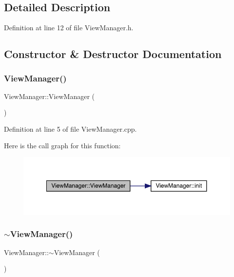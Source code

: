 \subsection{Detailed Description}


Definition at line 12 of file View\+Manager.\+h.



\subsection{Constructor \& Destructor Documentation}
\mbox{\label{class_view_manager_a0f78a0547f1946a9e19aa28d926ba152}} 
\subsubsection{\texorpdfstring{View\+Manager()}{ViewManager()}}
{\footnotesize\ttfamily View\+Manager\+::\+View\+Manager (\begin{DoxyParamCaption}{ }\end{DoxyParamCaption})}



Definition at line 5 of file View\+Manager.\+cpp.

Here is the call graph for this function\+:
\nopagebreak
\begin{figure}[H]
\begin{center}
\leavevmode
\includegraphics[width=350pt]{class_view_manager_a0f78a0547f1946a9e19aa28d926ba152_cgraph}
\end{center}
\end{figure}
\mbox{\label{class_view_manager_ad80032be506a890da62d887f1c9c050c}} 
\subsubsection{\texorpdfstring{$\sim$\+View\+Manager()}{~ViewManager()}}
{\footnotesize\ttfamily View\+Manager\+::$\sim$\+View\+Manager (\begin{DoxyParamCaption}{ }\end{DoxyParamCaption})}



